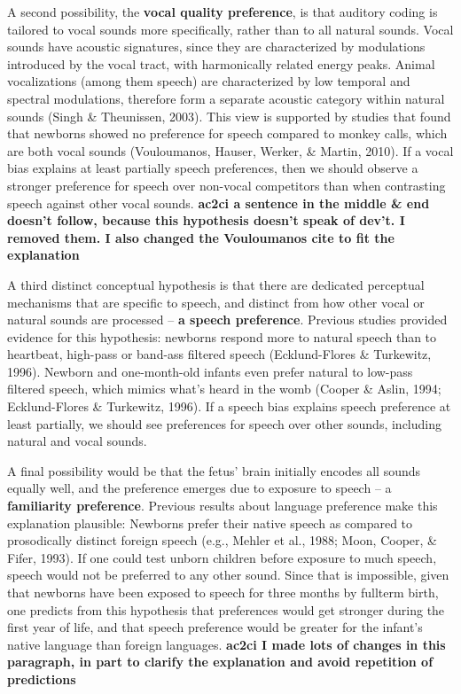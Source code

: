 \documentclass[
  english,
  man]{apa6}
\begin{document}
A second possibility, the \textbf{vocal quality preference}, is that auditory coding is tailored to vocal sounds more specifically, rather than to all natural sounds. Vocal sounds have acoustic signatures, since they are characterized by modulations introduced by the vocal tract, with harmonically related energy peaks. Animal vocalizations (among them speech) are characterized by low temporal and spectral modulations, therefore form a separate acoustic category within natural sounds (Singh \& Theunissen, 2003). This view is supported by studies that found that newborns showed no preference for speech compared to monkey calls, which are both vocal sounds (Vouloumanos, Hauser, Werker, \& Martin, 2010). If a vocal bias explains at least partially speech preferences, then we should observe a stronger preference for speech over non-vocal competitors than when contrasting speech against other vocal sounds.
\textbf{ac2ci a sentence in the middle \& end doesn't follow, because this hypothesis doesn't speak of dev't. I removed them. I also changed the Vouloumanos cite to fit the explanation}

A third distinct conceptual hypothesis is that there are dedicated perceptual mechanisms that are specific to speech, and distinct from how other vocal or natural sounds are processed -- \textbf{a speech preference}. Previous studies provided evidence for this hypothesis: newborns respond more to natural speech than to heartbeat, high-pass or band-ass filtered speech (Ecklund-Flores \& Turkewitz, 1996). Newborn and one-month-old infants even prefer natural to low-pass filtered speech, which mimics what's heard in the womb (Cooper \& Aslin, 1994; Ecklund-Flores \& Turkewitz, 1996). If a speech bias explains speech preference at least partially, we should see preferences for speech over other sounds, including natural and vocal sounds.

A final possibility would be that the fetus' brain initially encodes all sounds equally well, and the preference emerges due to exposure to speech -- a \textbf{familiarity preference}. Previous results about language preference make this explanation plausible: Newborns prefer their native speech as compared to prosodically distinct foreign speech (e.g., Mehler et al., 1988; Moon, Cooper, \& Fifer, 1993). If one could test unborn children before exposure to much speech, speech would not be preferred to any other sound. Since that is impossible, given that newborns have been exposed to speech for three months by fullterm birth, one predicts from this hypothesis that preferences would get stronger during the first year of life, and that speech preference would be greater for the infant's native language than foreign languages.
\textbf{ac2ci I made lots of changes in this paragraph, in part to clarify the explanation and avoid repetition of predictions}
\end{document}
